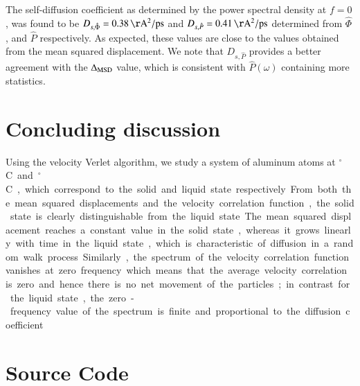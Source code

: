 The self-diffusion coefficient as determined by the power spectral density at $f=0$, was found to be  $D_{s, \hat \Phi} = \unit[0.38]{\AA^2/ps}$ and $D_{s, \hat P} = \unit[0.41]{\AA^2/ps}$ determined from $\hat \Phi$, and  $\hat P$ respectively. As expected, these values are close to the values obtained from the mean squared displacement. We note that $D_{s, \hat P}$ provides a better agreement with the $\Delta_{\rm MSD}$ value, which is consistent with $\hat P(\omega)$ containing more statistics.  

\section*{Concluding discussion}
Using the velocity Verlet algorithm, we study a system of aluminum atoms  at \unit[500]{$^\circ$ C} and \unit[700]{$^\circ$ C}, which correspond to the solid and liquid state respectively.

From both the mean squared displacements and the velocity correlation function, the solid state is 
clearly distinguishable from the liquid state. The mean squared displacement reaches a constant value in the solid state, whereas it grows linearly with time in the liquid state, which is characteristic of diffusion in a random walk process. Similarly, the spectrum of the velocity correlation function vanishes at zero frequency which means that the average velocity correlation is zero and hence there is no net movement of the particles; in contrast for the liquid state, the zero-frequency value of the spectrum is finite and proportional to the diffusion coefficient. 
\newpage

\appendix

\section{Source Code}

%

%

